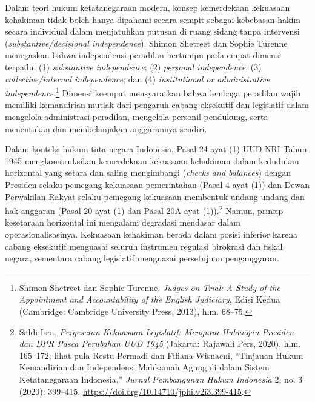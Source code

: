 \documentclass[12pt,a4paper,twocolumn]{article}
\begin{document}
Dalam teori hukum ketatanegaraan modern, konsep kemerdekaan kekuasaan kehakiman tidak boleh hanya dipahami secara sempit sebagai kebebasan hakim secara individual dalam menjatuhkan putusan di ruang sidang tanpa intervensi (\textit{substantive/decisional independence}). Shimon Shetreet dan Sophie Turenne menegaskan bahwa independensi peradilan bertumpu pada empat dimensi terpadu: (1) \textit{substantive independence}; (2) \textit{personal independence}; (3) \textit{collective/internal independence}; dan (4) \textit{institutional or administrative independence}.\footnote{Shimon Shetreet dan Sophie Turenne, \textit{Judges on Trial: A Study of the Appointment and Accountability of the English Judiciary}, Edisi Kedua (Cambridge: Cambridge University Press, 2013), hlm. 68--75.} Dimensi keempat mensyaratkan bahwa lembaga peradilan wajib memiliki kemandirian mutlak dari pengaruh cabang eksekutif dan legislatif dalam mengelola administrasi peradilan, mengelola personil pendukung, serta menentukan dan membelanjakan anggarannya sendiri.

Dalam konteks hukum tata negara Indonesia, Pasal 24 ayat (1) UUD NRI Tahun 1945 mengkonstruksikan kemerdekaan kekuasaan kehakiman dalam kedudukan horizontal yang setara dan saling mengimbangi (\textit{checks and balances}) dengan Presiden selaku pemegang kekuasaan pemerintahan (Pasal 4 ayat (1)) dan Dewan Perwakilan Rakyat selaku pemegang kekuasaan membentuk undang-undang dan hak anggaran (Pasal 20 ayat (1) dan Pasal 20A ayat (1)).\footnote{Saldi Isra, \textit{Pergeseran Kekuasaan Legislatif: Mengurai Hubungan Presiden dan DPR Pasca Perubahan UUD 1945} (Jakarta: Rajawali Pers, 2020), hlm. 165--172; lihat pula Restu Permadi dan Fifiana Wisnaeni, ``Tinjauan Hukum Kemandirian dan Independensi Mahkamah Agung di dalam Sistem Ketatanegaraan Indonesia,'' \textit{Jurnal Pembangunan Hukum Indonesia} 2, no. 3 (2020): 399--415, \url{https://doi.org/10.14710/jphi.v2i3.399-415}.} Namun, prinsip kesetaraan horizontal ini mengalami degradasi mendasar dalam operasionalisasinya. Kekuasaan kehakiman berada dalam posisi inferior karena cabang eksekutif menguasai seluruh instrumen regulasi birokrasi dan fiskal negara, sementara cabang legislatif menguasai persetujuan penganggaran.
\end{document}
